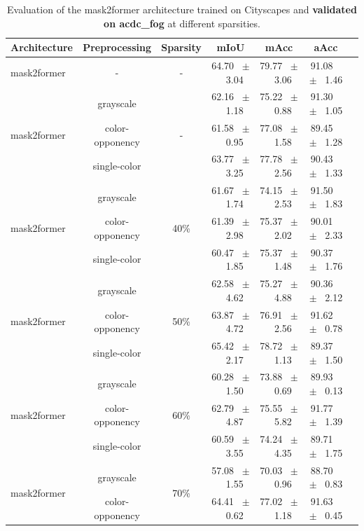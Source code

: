 \begin{table}[h]
  \centering
  \caption{Evaluation of the mask2former architecture trained on Cityscapes and \textbf{validated on acdc_fog} at different sparsities.}
  \begin{tabular}{@{}lccc ccc@{}}
    \toprule
    Architecture & Preprocessing & Sparsity & mIoU & mAcc & aAcc \\
    \midrule
    mask2former & - & - & 64.70 ~$\pm$~ 3.04 & 79.77 ~$\pm$~ 3.06 & 91.08 ~$\pm$~ 1.46 \\
    \midrule
    \midrule
    \multirow{3}{*}{mask2former} & grayscale & \multirow{3}{*}{-} & 62.16 ~$\pm$~ 1.18 & 75.22 ~$\pm$~ 0.88 & 91.30 ~$\pm$~ 1.05 \\
    & color-opponency & & 61.58 ~$\pm$~ 0.95 & 77.08 ~$\pm$~ 1.58 & 89.45 ~$\pm$~ 1.28 \\
    & single-color & & 63.77 ~$\pm$~ 3.25 & 77.78 ~$\pm$~ 2.56 & 90.43 ~$\pm$~ 1.33 \\
    \midrule
    \multirow{3}{*}{mask2former} & grayscale & \multirow{3}{*}{40\%} & 61.67 ~$\pm$~ 1.74 & 74.15 ~$\pm$~ 2.53 & 91.50 ~$\pm$~ 1.83 \\
    & color-opponency & & 61.39 ~$\pm$~ 2.98 & 75.37 ~$\pm$~ 2.02 & 90.01 ~$\pm$~ 2.33 \\
    & single-color & & 60.47 ~$\pm$~ 1.85 & 75.37 ~$\pm$~ 1.48 & 90.37 ~$\pm$~ 1.76 \\
    \midrule
    \multirow{3}{*}{mask2former} & grayscale & \multirow{3}{*}{50\%} & 62.58 ~$\pm$~ 4.62 & 75.27 ~$\pm$~ 4.88 & 90.36 ~$\pm$~ 2.12 \\
    & color-opponency & & 63.87 ~$\pm$~ 4.72 & 76.91 ~$\pm$~ 2.56 & 91.62 ~$\pm$~ 0.78 \\
    & single-color & & 65.42 ~$\pm$~ 2.17 & 78.72 ~$\pm$~ 1.13 & 89.37 ~$\pm$~ 1.50 \\
    \midrule
    \multirow{3}{*}{mask2former} & grayscale & \multirow{3}{*}{60\%} & 60.28 ~$\pm$~ 1.50 & 73.88 ~$\pm$~ 0.69 & 89.93 ~$\pm$~ 0.13 \\
    & color-opponency & & 62.79 ~$\pm$~ 4.87 & 75.55 ~$\pm$~ 5.82 & 91.77 ~$\pm$~ 1.39 \\
    & single-color & & 60.59 ~$\pm$~ 3.55 & 74.24 ~$\pm$~ 4.35 & 89.71 ~$\pm$~ 1.75 \\
    \midrule
    \multirow{3}{*}{mask2former} & grayscale & \multirow{3}{*}{70\%} & 57.08 ~$\pm$~ 1.55 & 70.03 ~$\pm$~ 0.96 & 88.70 ~$\pm$~ 0.83 \\
    & color-opponency & & 64.41 ~$\pm$~ 0.62 & 77.02 ~$\pm$~ 1.18 & 91.63 ~$\pm$~ 0.45 \\

\end{tabular}
\end{table}
